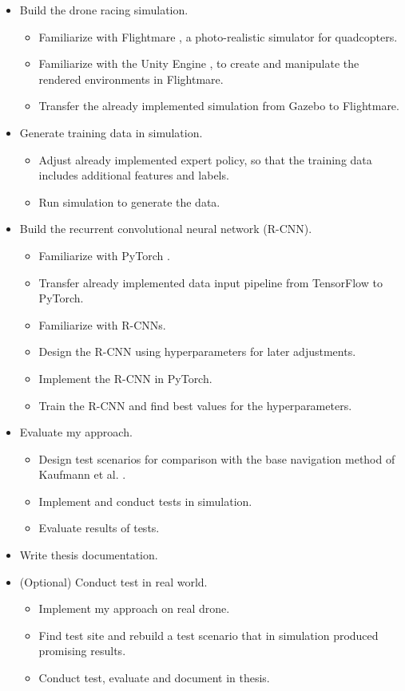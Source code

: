 \begin{itemize}
	\item Build the drone racing simulation.
	\begin{itemize}
		\item Familiarize with Flightmare \cite{song2020flightmare}, a photo-realistic simulator for quadcopters.
		\item Familiarize with the Unity Engine \cite{Unity}, to create and manipulate the rendered environments in Flightmare.
		\item Transfer the already implemented simulation from Gazebo \cite{Koenig2004} to Flightmare.
	\end{itemize}
	\item Generate training data in simulation.
	\begin{itemize}
		\item Adjust already implemented expert policy, so that the training data includes additional features and labels.
		\item Run simulation to generate the data.
	\end{itemize}
	\item Build the recurrent convolutional neural network (R-CNN).
	\begin{itemize}
		\item Familiarize with PyTorch \cite{NEURIPS2019_9015}.
		\item Transfer already implemented data input pipeline from TensorFlow \cite{tensorflow2015-whitepaper} to PyTorch.
		\item Familiarize with R-CNNs.
		\item Design the R-CNN using hyperparameters for later adjustments.
		\item Implement the R-CNN in PyTorch.
		\item Train the R-CNN and find best values for the hyperparameters.
	\end{itemize}
	\item Evaluate my approach.
	\begin{itemize}
		\item Design test scenarios for comparison with the base navigation method of Kaufmann et al. \cite{Kaufmann2018}.
		\item Implement and conduct tests in simulation. 
		\item Evaluate results of tests.
	\end{itemize}
	\item Write thesis documentation.
	\item (Optional) Conduct test in real world.
	\begin{itemize}
		\item Implement my approach on real drone.
		\item Find test site and rebuild a test scenario that in simulation produced promising results.
		\item Conduct test, evaluate and document in thesis.
	\end{itemize} 
 
\end{itemize}

